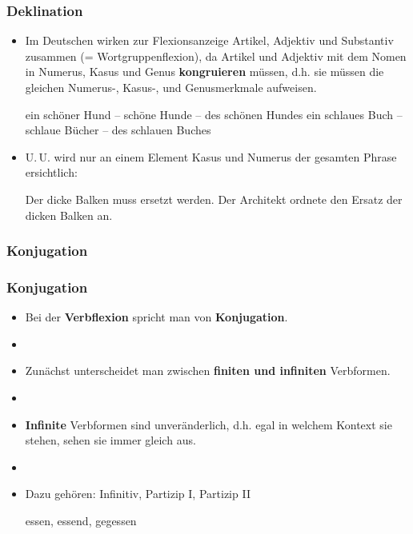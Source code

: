 
\begin{frame}
\frametitle{Deklination}

\begin{itemize}
	\item Im Deutschen wirken zur Flexionsanzeige Artikel, Adjektiv und Substantiv zusammen (= Wortgruppenflexion), da Artikel und Adjektiv mit dem Nomen in Numerus, Kasus und Genus \textbf{kongruieren} müssen, d.h. sie müssen die gleichen Numerus-, Kasus-, und Genusmerkmale aufweisen.
	
	\eal 
	\ex ein schöner Hund -- schöne Hunde -- des schönen Hundes
	\ex ein schlaues Buch -- schlaue Bücher -- des schlauen Buches
	\zl
	
	\item U.\,U. wird nur an einem Element Kasus und Numerus der gesamten Phrase ersichtlich:
	
	\eal 
	\ex Der dicke Balken muss ersetzt werden.
	\ex Der Architekt ordnete den Ersatz der dicken Balken an.
	\zl
	
\end{itemize}


\end{frame}


\subsubsection{Konjugation}



\begin{frame}
\frametitle{Konjugation}

\begin{itemize}
	\item Bei der \textbf{Verbflexion} spricht man von \textbf{Konjugation}.
	\item[]
	\item Zunächst unterscheidet man zwischen \textbf{finiten und infiniten} Verbformen.
	\item[]
	\item \textbf{Infinite} Verbformen sind unveränderlich, d.h. egal in welchem Kontext sie stehen, sehen sie immer gleich aus.
	\item[]
	\item Dazu gehören: Infinitiv, Partizip I, Partizip II
	
	\ea essen, essend, gegessen
	\z
	
\end{itemize}


\end{frame}



